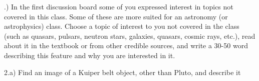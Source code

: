 \documentclass{report}
\title{\Huge{}}
\author{\huge{Nathan Warner}}
\date{\huge{}}
\begin{document}
    \bigbreak {}.) In the first discussion board some of you expressed interest in topics not covered in this
class. Some of these are more suited for an astronomy (or astrophysics) class. Choose a topic of
interest to you not covered in the class (such as quasars, pulsars, neutron stars, galaxies,
quasars, cosmic rays, etc.), read about it in the textbook or from other credible sources, and
write a 30-50 word describing this feature and why you are interested in it.
    \bigbreak \noindent 

    \bigbreak \noindent 
    2.a)  Find an image of a Kuiper belt object, other than Pluto, and describe it
    \bigbreak \noindent 
\end{document}
